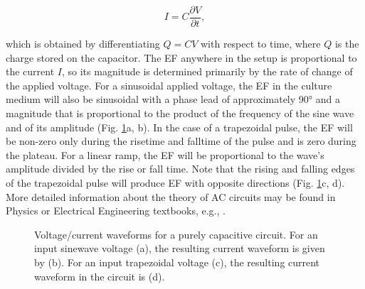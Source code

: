 \begin{equation}
\label{eqRelation}
I = C \frac{\partial V}{\partial t},
\end{equation}

\noindent which is obtained by differentiating $Q = CV$ with respect to time, where $Q$ is the charge stored on the capacitor. The \acs{EF} anywhere in the setup is proportional to the current $I$, so its magnitude is determined primarily by the rate of change of the applied voltage. For a sinusoidal applied voltage, the \acs{EF} in the culture medium will also be sinusoidal with a phase lead of approximately 90\si{\degree} and a magnitude that is proportional to the product of the frequency of the sine wave and of its amplitude (Fig. \ref{fig5d4}a, b). In the case of a trapezoidal pulse, the \acs{EF} will be non-zero only during the risetime and falltime of the pulse and is zero during the plateau. For a linear ramp, the \acs{EF} will be proportional to the wave's amplitude divided by the rise or fall time. Note that the rising and falling edges of the trapezoidal pulse will produce \acs{EF} with opposite directions (Fig. \ref{fig5d4}c, d). More detailed information about the theory of \acs{AC} circuits may be found in Physics or Electrical Engineering textbooks, e.g., \cite[Subchapters 7.2-7.4]{Grant1990}. \hfill \break


\begin{figure}
\caption{Voltage/current waveforms for a purely capacitive circuit. For an input sinewave voltage (a), the resulting current waveform is given by (b). For an input trapezoidal voltage (c), the resulting current waveform in the circuit is (d).}
\label{fig5d4}
\end{figure}


